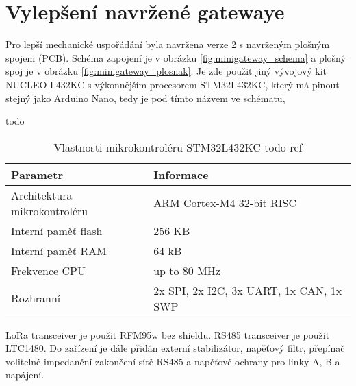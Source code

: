 \section{Vylepšení navržené gatewaye}
Pro lepší mechanické uspořádání byla navržena verze 2 s navrženým plošným spojem (PCB).
Schéma zapojení je v obrázku \ref{fig:minigateway_schema} a plošný spoj je v obrázku \ref{fig:minigateway_plosnak}.
Je zde použit jiný vývojový kit NUCLEO-L432KC s výkonnějším procesorem STM32L432KC, který má pinout stejný jako Arduino Nano, tedy je pod tímto názvem ve schématu, 


todo
\begin{longtable}{|l|p{3.5cm}|}
    \caption{Vlastnosti mikrokontroléru STM32L432KC todo ref \cite{nucleoST}}
    \label{tab:mcuFeatures} \\
    \hline

    Parametr          & Informace            \\ \hline \hline

    Architektura mikrokontroléru & ARM Cortex-M4 32-bit RISC \\ \hline
    Interní paměť flash       & 256 KB \\ \hline
    Interní paměť RAM         & 64 kB \\ \hline
    Frekvence CPU               & up to 80 MHz \\ \hline
    Rozhranní                  & 2x SPI, 2x I2C, 3x UART, 1x CAN, 1x SWP \\ \hline

\end{longtable}



LoRa transceiver je použit RFM95w \cite{RFM95w} bez shieldu.
RS485 transceiver je použit LTC1480. 
Do zařízení je dále přidán externí stabilizátor, napěťový filtr, přepínač volitelné impedanční zakončení sítě RS485 a napěťové ochrany pro linky A, B a napájení. 



